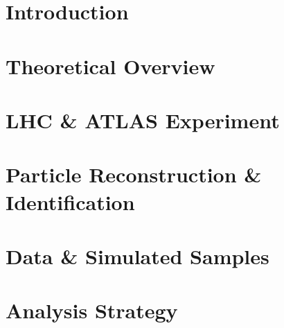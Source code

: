\documentclass{msuphddissertation}
\begin{document}
\newpage
{}
\begin{doublespace}


{
\FormatChapterTitles  %



\chapter{Introduction}
\label{chap:intro}


\chapter{Theoretical Overview}
\label{chap:theory}


\chapter{LHC \& ATLAS Experiment}
\label{chap:LHCATLAS}


\chapter{Particle Reconstruction \& Identification}
\label{chap:reco}


\chapter{Data \& Simulated Samples}
\label{chap:samples}


\chapter{Analysis Strategy}
\label{chap:anal}


}
\end{doublespace}
\end{document}
